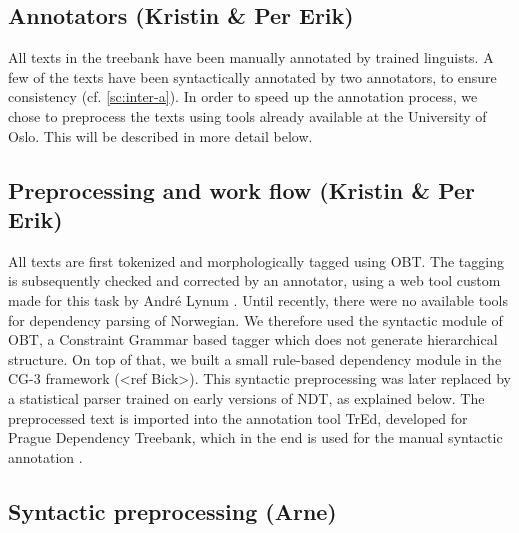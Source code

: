 \documentclass[11pt,a4paper]{article}
\begin{document}
\subsection{Annotators (Kristin \& Per Erik)}
All texts in the treebank have been manually annotated by trained linguists. A few of the texts have been syntactically annotated by two annotators, to ensure consistency (cf. \ref{sc:inter-a}). In order to speed up the annotation process, we chose to preprocess the texts using tools already available at the University of Oslo. This will be described in more detail below.

\subsection{Preprocessing and work flow (Kristin \& Per Erik)}
All texts are first tokenized and morphologically tagged using OBT. The tagging is subsequently checked and corrected by an annotator, using a web tool custom made for this task by André Lynum \cite{Lyn:13}. 
Until recently, there were no available tools for dependency parsing of Norwegian. We therefore used the syntactic module of OBT, a Constraint Grammar based tagger which does not generate hierarchical structure. On top of that, we built a small rule-based dependency module in the CG-3 framework (<ref Bick>). This syntactic preprocessing was later replaced by a statistical parser trained on early versions of NDT, as explained below. The preprocessed text is imported into the annotation tool TrEd, developed for Prague Dependency Treebank, which in the end is used for the manual syntactic annotation \cite{Paj:Ste:08}.  



\subsection{Syntactic preprocessing (Arne)}
\end{document}
